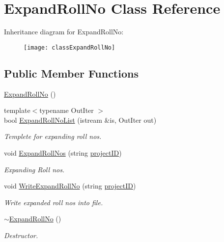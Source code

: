 \hypertarget{classExpandRollNo}{\section{Expand\-Roll\-No Class Reference}
\label{classExpandRollNo}
}
Inheritance diagram for Expand\-Roll\-No\-:\begin{figure}[H]
\begin{center}
\leavevmode
\texttt{[image: classExpandRollNo]}
\end{center}
\end{figure}
\subsection*{Public Member Functions}
\begin{DoxyCompactItemize}
\item 
\hyperlink{classExpandRollNo_a60e3a3d50ebe826b6d5c3304757812ca}{Expand\-Roll\-No} ()
\item 
{\footnotesize template$<$typename Out\-Iter $>$ }\\bool \hyperlink{classExpandRollNo_afcb476d9d9f1fdabd456f3ec84b14184}{Expand\-Roll\-No\-List} (istream \&is, Out\-Iter out)
\begin{DoxyCompactList}\small\item\em Templete for expanding roll nos. \end{DoxyCompactList}\item 
void \hyperlink{classExpandRollNo_a4917831a98da9aa068b2589945b46065}{Expand\-Roll\-Nos} (string \hyperlink{classReadInput_a3ad470a25b3e0a29466bf4ff1f7d8e81}{project\-I\-D})
\begin{DoxyCompactList}\small\item\em Expanding Roll nos. \end{DoxyCompactList}\item 
void \hyperlink{classExpandRollNo_af95bc4c35354c225bdfff5fae7f6b845}{Write\-Expand\-Roll\-No} (string \hyperlink{classReadInput_a3ad470a25b3e0a29466bf4ff1f7d8e81}{project\-I\-D})
\begin{DoxyCompactList}\small\item\em Write expanded roll nos into file. \end{DoxyCompactList}\item 
\hyperlink{classExpandRollNo_acf3cb7b789bd49a79672cb93dac2ed7c}{$\sim$\-Expand\-Roll\-No} ()
\begin{DoxyCompactList}\small\item\em Destructor. \end{DoxyCompactList}\end{DoxyCompactItemize}
